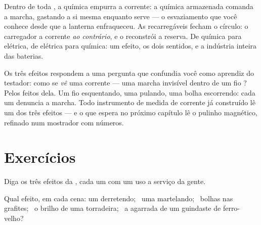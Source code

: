 \begin{example}\label{ex:g8:electric-current-effects:battery}
Dentro de toda , a química empurra a corrente: a  química
armazenada comanda a marcha, gastando a si mesma enquanto serve --- o
esvaziamento que você conhece desde que a lanterna enfraqueceu. As
 recarregáveis fecham o círculo: o carregador  a corrente
\emph{ao contrário}, e o  reconstrói a reserva. De
química para elétrica, de elétrica para química: um efeito, os dois
sentidos, e a indústria inteira das baterias.
\end{example}

\begin{remark}\label{rem:g8:electric-current-effects:detect}
Os três efeitos respondem a uma pergunta que confundia você como
aprendiz do testador: como se \emph{vê} uma corrente --- uma marcha
invisível dentro de um fio ? Pelos feitos dela. Um fio
esquentando, uma  pulando, uma bolha escorrendo: cada um
denuncia a marcha. Todo instrumento de medida de corrente já
construído lê um dos três efeitos --- e o que espera no próximo
capítulo lê o pulinho magnético, refinado num mostrador com números.
\end{remark}

\section{Exercícios}

\begin{exercise}[$\star$]\label{exo:g8:electric-current-effects:1}
Diga os três efeitos da , cada um com um uso a
serviço da gente.
\end{exercise}

\begin{exercise}[$\star$]\label{exo:g8:electric-current-effects:2}
Qual efeito, em cada cena: um  derretendo; \ uma 
martelando; \ bolhas nas grafites; \ o brilho de uma torradeira; \ a
agarrada de um guindaste de ferro-velho?
\end{exercise}

